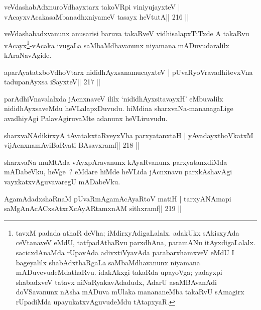 \begin{shl}
veVdashabAdxnuroVdhayxtarx takoVR\s pi viniyujayxteV |
vAcayxvAcakasaMbanadhxniyameV tasayx heVtutA\hfill || 216 ||
\end{shl}

\begin{artha}
veVdashabadxvanunx anusarisi baruva takaRveV vidhisalapxTiTxde A takaRvu vAcayx\footnote[1]{tavxM padada athaR deVha; iMdirxyAdigaLalalx. adakUkx sAkisxyAda ceVtanaveV eMdU, tatfpadAthaRvu parxdhAna, paramANu itAyxdigaLalalx. sacicxdAnaMda rUpavAda adivxtiVyavAda parabarxhamxveV eMdU I bageyalilx shabAdxthaRgaLa saMbaMdhavanunx niyamana mADuvevudeMdathaRvu. idakAkxgi takaRda upayoVga; yadayxpi shabadxveV tatavx niNaRyakavAdadudx, AdarU asaMBAvanAdi doVSavanunx nAsha mADuva mUlaka manananeMba takaRvU sAmagirx rUpadiMda upayukatxvAguvudeMdu tAtapxyaR.}-vAcaka ivugaLa saMbaMdhavanunx niyamana mADuvudaralilx kAraNavAgide.
\end{artha}

\begin{shl}
aparAyatatxboVdhoV\s tarx nididhAyxsanamucayxteV |
pUvaRyoVravadhitevxVna tadupanAyxsa iSayxteV\hfill || 217 ||
\end{shl}

\begin{artha}
parAdhiVnavalalxda jAcnxnaveV ililx `nididhAyxsitavayxH' eMbuvalilx nididhAyxsaveMdu heVLalapxDuvudu. hiMdina sharxvaNa-mananagaLige avadhiyAgi PalavAgiruvaMte adanunx heVLiruvudu.
\end{artha}

\begin{shl}
sharxvaNAdikirxyA tAvatakxtaRveyxVha parxyatanxtaH |
yAvadayxthoVkatxM vijAcnxnamAviBaRvati BAsavxramf\hfill || 218 ||
\end{shl}

\begin{artha}
sharxvaNa muMtAda vAyxpAravanunx kAyaRvanunx parxyatanxdiMda mADabeVku, heVge~? eMdare hiMde heVLida jAcnxnavu parxkAshavAgi vayxkatxvAguvavaregU mADabeVku.
\end{artha}


\begin{shl}
AgamAdadxshaRnaM pUvaRmAgamAcAyaRtoV matiH |
tarxyANAmapi saMgAnAcACxsAtxrXcAyARtamxnAM sithxramf\hfill || 219 ||
\end{shl}

